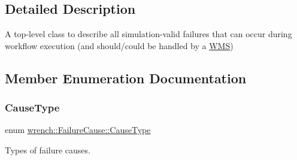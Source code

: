 \subsection{Detailed Description}
A top-\/level class to describe all simulation-\/valid failures that can occur during workflow execution (and should/could be handled by a \hyperlink{classwrench_1_1_w_m_s}{W\+MS}) 

\subsection{Member Enumeration Documentation}
\mbox{\label{classwrench_1_1_failure_cause_a6d06d6845ca5499c5cbbd9e1a08c9c77}} 
\subsubsection{\texorpdfstring{Cause\+Type}{CauseType}}
{\footnotesize\ttfamily enum \hyperlink{classwrench_1_1_failure_cause_a6d06d6845ca5499c5cbbd9e1a08c9c77}{wrench\+::\+Failure\+Cause\+::\+Cause\+Type}}



Types of failure causes. 

